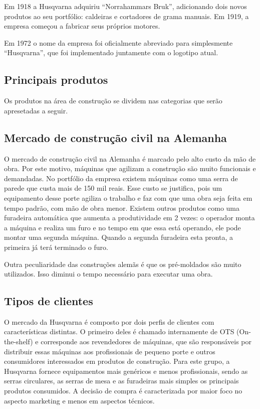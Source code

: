 \documentclass[12pt]{article}
\begin{document}
	Em 1918 a Husqvarna adquiriu “Norrahammars Bruk”, adicionando dois novos produtos ao seu portfólio: caldeiras e cortadores de grama manuais. Em 1919, a empresa começou a fabricar seus próprios motores.

	Em 1972 o nome da empresa foi oficialmente abreviado para simplesmente “Husqvarna”, que foi implementado juntamente com o logotipo atual.

\subsection{Principais produtos}

	Os produtos na área de construção se dividem nas categorias que serão apresetadas a seguir.

\subsection{Mercado de construção civil na Alemanha}

	O mercado de construção civil na Alemanha é marcado pelo alto custo da mão de obra. Por este motivo, máquinas que agilizam a construção são muito funcionais e demandadas. No portfólio da empresa existem máquinas como uma serra de parede que custa mais de 150 mil reais. Esse custo se justifica, pois um equipamento desse porte agiliza o trabalho e faz com que uma obra seja feita em tempo padrão, com mão de obra menor. Existem outros produtos como uma furadeira automática que aumenta a produtividade em 2 vezes: o operador monta a máquina e realiza um furo e no tempo em que essa está operando, ele pode montar uma segunda máquina. Quando a segunda furadeira esta pronta, a primeira já terá terminado o furo.

	Outra peculiaridade das construções alemãs é que os pré-moldados são muito utilizados. Isso diminui o tempo necessário para executar uma obra.

\subsection{Tipos de clientes}

	O mercado da Husqvarna é composto por dois perfis de clientes com características distintas. O primeiro deles é chamado internamente de OTS (On-the-shelf) e corresponde aos revendedores de máquinas, que são responsáveis por distribuir essas máquinas aos profissionais de pequeno porte e outros consumidores interessados em produtos de construção. Para este grupo, a Husqvarna fornece equipamentos mais genéricos e menos profissionais, sendo as serras circulares, as serras de mesa e as furadeiras mais simples os principais produtos consumidos. A decisão de compra é caracterizada por maior foco no aspecto marketing e menos em aspectos técnicos.
\end{document}

